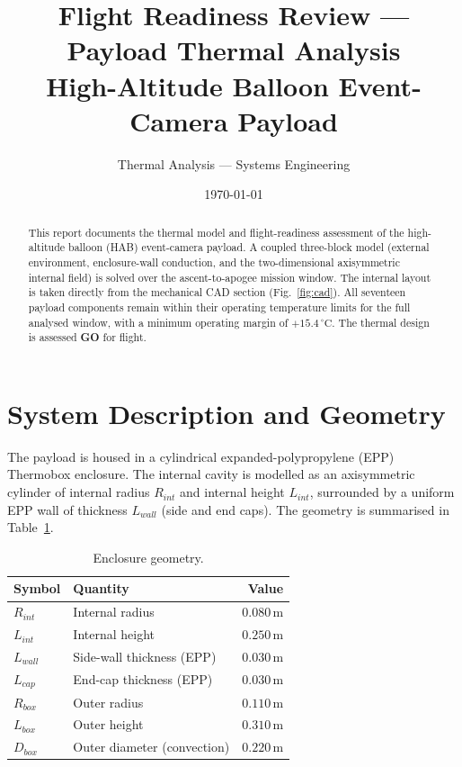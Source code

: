 \documentclass[11pt,a4paper]{article}
\title{\textbf{Flight Readiness Review --- Payload Thermal Analysis}\\[2mm]
\large High-Altitude Balloon Event-Camera Payload}
\author{Thermal Analysis --- Systems Engineering}
\date{\today}
\newcommand{\degC}{\,^{\circ}\mathrm{C}}
\newcommand{\unit}[1]{\,\mathrm{#1}}
\begin{document}
\maketitle

\begin{abstract}
\noindent This report documents the thermal model and flight-readiness assessment of
the high-altitude balloon (HAB) event-camera payload. A coupled three-block model
(external environment, enclosure-wall conduction, and the two-dimensional axisymmetric
internal field) is solved over the ascent-to-apogee mission window. The internal layout
is taken directly from the mechanical CAD section (Fig.~\ref{fig:cad}). All seventeen
payload components remain within their operating temperature limits for the full
analysed window, with a minimum operating margin of $+15.4\degC$. The thermal design is
assessed \textbf{GO} for flight.
\end{abstract}

\tableofcontents
\bigskip

\section{System Description and Geometry}
The payload is housed in a cylindrical expanded-polypropylene (EPP) Thermobox enclosure.
The internal cavity is modelled as an axisymmetric cylinder of internal radius $R_{int}$
and internal height $L_{int}$, surrounded by a uniform EPP wall of thickness $L_{wall}$
(side and end caps). The geometry is summarised in Table~\ref{tab:geom}.

\begin{table}[H]
\centering
\caption{Enclosure geometry.}
\label{tab:geom}
\begin{tabular}{llr}
\toprule
Symbol & Quantity & Value \\
\midrule
$R_{int}$ & Internal radius            & $0.080\unit{m}$ \\
$L_{int}$ & Internal height            & $0.250\unit{m}$ \\
$L_{wall}$& Side-wall thickness (EPP)  & $0.030\unit{m}$ \\
$L_{cap}$ & End-cap thickness (EPP)    & $0.030\unit{m}$ \\
$R_{box}$ & Outer radius               & $0.110\unit{m}$ \\
$L_{box}$ & Outer height               & $0.310\unit{m}$ \\
$D_{box}$ & Outer diameter (convection)& $0.220\unit{m}$ \\
\bottomrule
\end{tabular}
\end{table}
\end{document}
